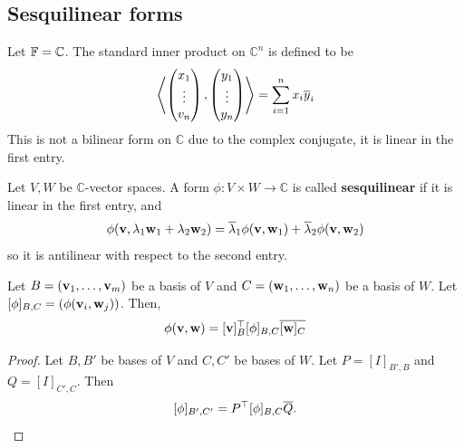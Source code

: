 \documentclass[a4paper]{article}
\begin{document}
\subsection{Sesquilinear forms}
Let \( {\mathbb{F}} = \mathbb C \).
The standard inner product on \( \mathbb C^n \) is defined to be
\[
	\left\langle{\begin{pmatrix} x_1 \\ \vdots \\ v_n \end{pmatrix}, \begin{pmatrix} y_1 \\ \vdots \\ y_n \end{pmatrix}}\right\rangle = \sum_{i=1}^n x_i \overline y_i
\]
This is not a bilinear form on \( \mathbb C \) due to the complex conjugate, it is linear in the first entry.
\begin{definition}
	Let \( V, W \) be \( \mathbb C \)-vector spaces.
	A form \( \phi \colon V \times W \to \mathbb C \) is called \textbf{sesquilinear} if it is linear in the first entry, and
	\[
		\phi({\bf v}, \lambda_1 {\bf w}_1 + \lambda_2 {\bf w}_2) = \overline \lambda_1 \phi({\bf v},{\bf w}_1) + \overline \lambda_2 \phi({\bf v},{\bf w}_2)
	\]
	so it is antilinear with respect to the second entry.
\end{definition}
\begin{lemma}
	Let \( B = ({\bf v}_1, \dots, {\bf v}_m) \) be a basis of \( V \) and \( C = ({\bf w}_1, \dots, {\bf w}_n) \) be a basis of \( W \).
	Let \( [\phi]_{B,C} = \qty(\phi({\bf v}_i, {\bf w}_j)) \).
	Then,
	\[
		\phi({\bf v},{\bf w}) = [{\bf v}]_B^\top [\phi]_{B,C} \overline{[{\bf w}]_C}
	\]
\end{lemma}
\begin{proof}
	Let \( B, B' \) be bases of \( V \) and \( C, C' \) be bases of \( W \).
	Let \( P = [I]_{B', B} \) and \( Q = [I]_{C', C} \).
	Then
	\[
		[\phi]_{B', C'} = P^\top [\phi]_{B,C} \overline Q. \qedhere
	\]
\end{proof}
\end{document}
